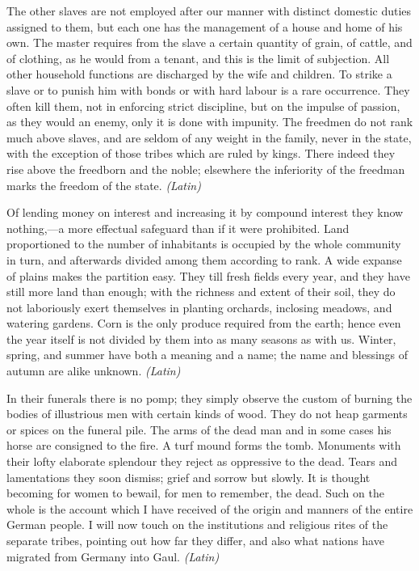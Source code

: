 
The other slaves are not employed after our manner with distinct domestic duties assigned to them, but each one has the management of a house and home of his own. The master requires from the slave a certain quantity of grain, of cattle, and of clothing, as he would from a tenant, and this is the limit of subjection. All other household functions are discharged by the wife and children. To strike a slave or to punish him with bonds or with hard labour is a rare occurrence. They often kill them, not in enforcing strict discipline, but on the impulse of passion, as they would an enemy, only it is done with impunity. The freedmen do not rank much above slaves, and are seldom of any weight in the family, never in the state, with the exception of those tribes which are ruled by kings. There indeed they rise above the freedborn and the noble; elsewhere the inferiority of the freedman marks the freedom of the state. \emph{(Latin)}


Of lending money on interest and increasing it by compound interest they know nothing,—a more effectual safeguard than if it were prohibited. Land proportioned to the number of inhabitants is occupied by the whole community in turn, and afterwards divided among them according to rank. A wide expanse of plains makes the partition easy. They till fresh fields every year, and they have still more land than enough; with the richness and extent of their soil, they do not laboriously exert themselves in planting orchards, inclosing meadows, and watering gardens. Corn is the only produce required from the earth; hence even the year itself is not divided by them into as many seasons as with us. Winter, spring, and summer have both a meaning and a name; the name and blessings of autumn are alike unknown. \emph{(Latin)}


In their funerals there is no pomp; they simply observe the custom of burning the bodies of illustrious men with certain kinds of wood. They do not heap garments or spices on the funeral pile. The arms of the dead man and in some cases his horse are consigned to the fire. A turf mound forms the tomb. Monuments with their lofty elaborate splendour they reject as oppressive to the dead. Tears and lamentations they soon dismiss; grief and sorrow but slowly. It is thought becoming for women to bewail, for men to remember, the dead. Such on the whole is the account which I have received of the origin and manners of the entire German people. I will now touch on the institutions and religious rites of the separate tribes, pointing out how far they differ, and also what nations have migrated from Germany into Gaul. \emph{(Latin)}

